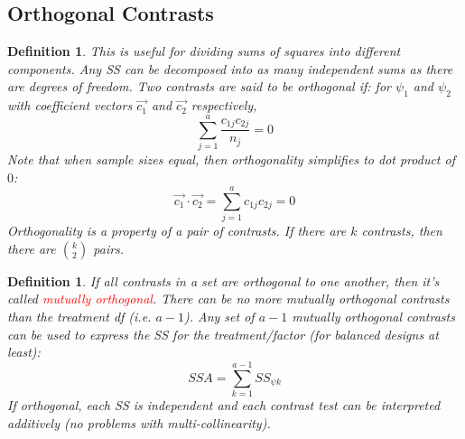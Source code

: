 \documentclass[a4paper,11pt]{article}
\newtheorem{defn}[thm]{Definition}
\begin{document}
\subsection{Orthogonal Contrasts}
\begin{defn}
\normalfont
This is useful for dividing sums of squares into different components. Any SS can be decomposed into as many independent sums as there are degrees of freedom. Two contrasts are said to be {orthogonal} if: for $\psi_1$ and $\psi_2$ with coefficient vectors $\vec{c_1}$ and $\vec{c_2}$ respectively, 
$$\sum_{j=1}^a\frac{c_{1j}c_{2j}}{n_j}=0$$
Note that when sample sizes equal, then orthogonality simplifies to dot product of $0$:
$$\vec{c_1}\cdot \vec{c_2}=\sum_{j=1}^ac_{1j}c_{2j}=0$$
Orthogonality is a property of a pair of contrasts. If there are $k$ contrasts, then there are ${k\choose 2}$ pairs. 
\end{defn}
\begin{defn}
\normalfont
If all contrasts in a set are orthogonal to one another, then it's called \textcolor{red}{mutually orthogonal}. There can be no more mutually orthogonal contrasts than the treatment df (i.e. $a-1$). Any set of $a-1$ mutually orthogonal contrasts can be used to express the SS for the treatment/factor (for balanced designs at least): 
$$SSA=\sum_{k=1}^{a-1}SS_{\psi k}$$
If orthogonal, each SS is independent and each contrast test can be interpreted additively (no problems with multi-collinearity). 
\end{defn}
\end{document}
